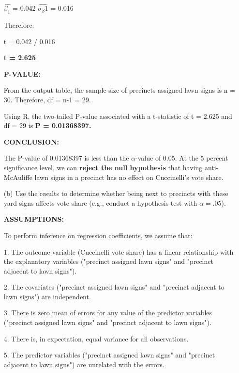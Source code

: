 \documentclass[12pt,letterpaper]{article}
\begin{document}
\begin{enumerate}
	$\hat{\beta_1}$ = 0.042
	$\hat{\sigma_\beta1}$ = 0.016
	
	Therefore:
	
	t = 0.042 / 0.016
	
\textbf{	t = 2.625}
	
		 \vspace{3cm}
	\textbf{P-VALUE:}
	
	From the output table, the sample size of precincts assigned lawn signs is n = 30. Therefore, df = n-1 = 29. 
	
		 
	
	Using R, the two-tailed P-value associated with a t-statistic of t = 2.625 and df = 29 is \textbf{P = 0.01368397.}
	
		 \vspace{.5cm}
	\textbf{CONCLUSION:}
	
	The P-value of 0.01368397 is less than the $\alpha$-value of 0.05. At the 5 percent significance level, we can \textbf{reject the null hypothesis} that having anti-McAuliffe lawn signs in a precinct has no effect on Cuccinelli's vote share. 
	
	\newpage		
	\item [(b)]  Use the results to determine whether being
	next to precincts with these yard signs affects vote
	share (e.g., conduct a hypothesis test with $\alpha = .05$). \vspace{.5cm}
	
		\textbf{ASSUMPTIONS:}
	
	To perform inference on regression coefficients, we assume that:
	
	1. The outcome variable (Cuccinelli vote share) has a linear relationship with the explanatory variables ("precinct assigned lawn signs" and "precinct adjacent to lawn signs").
	
	2. The covariates ("precinct assigned lawn signs" and "precinct adjacent to lawn signs") are independent.
	
	3. There is zero mean of errors for any value of the predictor variables ("precinct assigned lawn signs" and "precinct adjacent to lawn signs").
	
	4. There is, in expectation, equal variance for all observations. 
	
	5. The predictor variables ("precinct assigned lawn signs" and "precinct adjacent to lawn signs") are unrelated with the errors.  \vspace{.5cm}
	

\end{enumerate}
\end{document}

